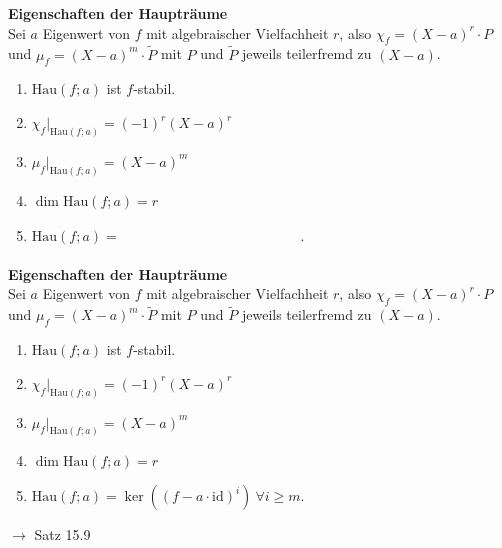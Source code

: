 \documentclass[11pt]{article}
\renewcommand{\cite}[1]{\par\bigskip\hfill{\color{gray}\tiny\(\to\) #1}}
\renewcommand{\geq}{\geqslant}
\newcommand{\id}{\mathrm{id}}
\newenvironment{field}{}{\newpage}
\newif\ifnote
\newenvironment{note}{\notetrue}{\notefalse}
\newcommand{\localtag}{}
\newcommand{\globaltag}{}
\newcommand{\uuid}{}
\newcommand{\tags}[1]{
    \ifnote
        \renewcommand{\localtag}{#1}
    \else
        \renewcommand{\globaltag}{#1}
    \fi
    }
\newcommand{\xplain}[1]{\renewcommand{\uuid}{#1}}
\begin{document}
\begin{note}
    \tags{Satz}
    \xplain{5416b650-4583-4a20-90b5-6c32a203b282}

    \begin{field}
        \textbf{Eigenschaften der Haupträume}\\
        Sei $a$ Eigenwert von $f$ mit algebraischer Vielfachheit $r$, also $\chi_f = (X-a)^r\cdot P$ und $\mu_f = (X-a)^m\cdot \tilde P$ mit $P$ und $\tilde P$ jeweils teilerfremd zu $(X-a)$.
        \begin{enumerate}[(1)]
            \item $\text{Hau}(f;a)$ ist $f$-stabil.
            \item $\chi_f\vert_{\text{Hau}(f;a)} = (-1)^r(X-a)^r$
            \item $\mu_f\vert_{\text{Hau}(f;a)} = (X-a)^m$
            \item $\dim \text{Hau}(f;a) = r$
            \item $\text{Hau}(f;a)= \phantom{\ker((f- a\cdot \id)^i) \ \forall i \geq m}$.
        \end{enumerate}
    \end{field}
    \begin{field}
        \textbf{Eigenschaften der Haupträume}\\
        Sei $a$ Eigenwert von $f$ mit algebraischer Vielfachheit $r$, also $\chi_f = (X-a)^r\cdot P$ und $\mu_f = (X-a)^m\cdot \tilde P$ mit $P$ und $\tilde P$ jeweils teilerfremd zu $(X-a)$.
        \begin{enumerate}[(1)]
            \item $\text{Hau}(f;a)$ ist $f$-stabil.
            \item $\chi_f\vert_{\text{Hau}(f;a)} = (-1)^r(X-a)^r$
            \item $\mu_f\vert_{\text{Hau}(f;a)} = (X-a)^m$
            \item $\dim \text{Hau}(f;a) = r$
            \item $\text{Hau}(f;a)= \ker((f- a\cdot \id)^i) \ \forall i \geq m$.
        \end{enumerate}
        \cite{Satz 15.9}
    \end{field}
\end{note}
\end{document}
